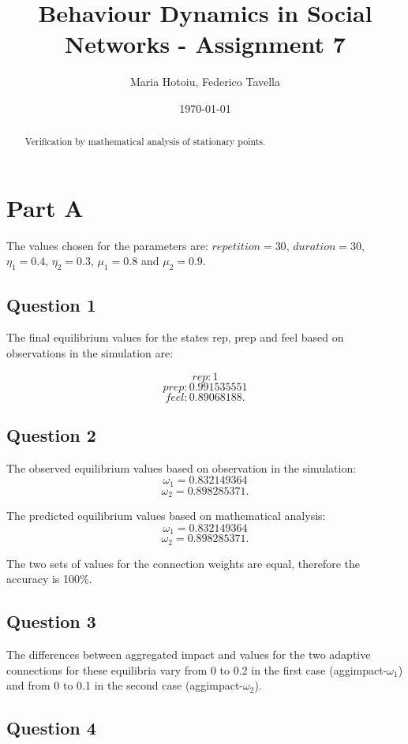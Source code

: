\documentclass[a4paper]{article}
\title{Behaviour Dynamics in Social Networks - Assignment 7}
\author{Maria Hotoiu, Federico Tavella}
\date{\today}
\begin{document}
\maketitle

\begin{abstract}
Verification by mathematical analysis of stationary points.
\end{abstract}

\section{Part A}

The values chosen for the parameters are: $repetition = 30$, $duration = 30$, $\eta_{1} = 0.4$, $\eta_{2} = 0.3$, $\mu_{1} = 0.8$ and $\mu_{2} = 0.9$.

\subsection{Question 1}
The final equilibrium values for the states rep, prep and feel based on observations in the simulation are:

$$rep: 1$$
$$prep: 0.991535551$$
$$feel: 0.89068188.$$

\subsection{Question 2}

The observed equilibrium values based on observation in the simulation:
$$\omega_{1} = 0.832149364$$
$$\omega_{2} = 0.898285371.$$

\noindent The predicted equilibrium values based on mathematical analysis:
$$\omega_{1} = 0.832149364$$
$$\omega_{2} = 0.898285371.$$

The two sets of values for the connection weights are equal, therefore the accuracy is 100\%.

\subsection{Question 3}

The differences between aggregated impact and values for the two adaptive connections for these equilibria vary from 0 to 0.2 in the first case (aggimpact-$\omega_{1}$) and from 0 to 0.1 in the second case (aggimpact-$\omega_{2}$). 

\subsection{Question 4}
\end{document}
